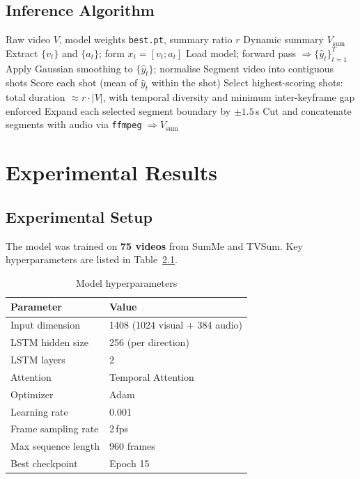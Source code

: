 \documentclass[12pt, a4paper]{report}
\begin{document}
\section{Inference Algorithm}

\begin{algorithm}[H]
\caption{Dynamic Video Summary Generation}
\begin{algorithmic}[1]
  \Require Raw video $V$, model weights \texttt{best.pt}, summary ratio $r$
  \Ensure Dynamic summary $V_{\text{sum}}$
  \State Extract $\{v_t\}$ and $\{a_t\}$; form $x_t = [v_t; a_t]$
  \State Load model; forward pass $\Rightarrow \{\hat{y}_t\}_{t=1}^{T}$
  \State Apply Gaussian smoothing to $\{\hat{y}_t\}$; normalise
  \State Segment video into contiguous shots
  \State Score each shot (mean of $\hat{y}_t$ within the shot)
  \State Select highest-scoring shots: total duration $\approx r \cdot |V|$,
         with temporal diversity and minimum inter-keyframe gap enforced
  \State Expand each selected segment boundary by $\pm 1.5$\,s
  \State Cut and concatenate segments with audio via \texttt{ffmpeg}
         $\Rightarrow V_{\text{sum}}$
\end{algorithmic}
\end{algorithm}

\chapter{Experimental Results}

\section{Experimental Setup}

The model was trained on \textbf{75 videos} from SumMe and TVSum.
Key hyperparameters are listed in Table~\ref{tab:hyperparams}.

\begin{table}[H]
\centering
\caption{Model hyperparameters}
\label{tab:hyperparams}
\begin{tabular}{ll}
  \toprule
  \textbf{Parameter} & \textbf{Value} \\
  \midrule
  Input dimension      & 1408 (1024 visual + 384 audio) \\
  LSTM hidden size     & 256 (per direction) \\
  LSTM layers          & 2 \\
  Attention            & Temporal Attention \\
  Optimizer            & Adam \\
  Learning rate        & 0.001 \\
  Frame sampling rate  & 2\,fps \\
  Max sequence length  & 960 frames \\
  Best checkpoint      & Epoch 15 \\
  \bottomrule
\end{tabular}
\end{table}
\end{document}

